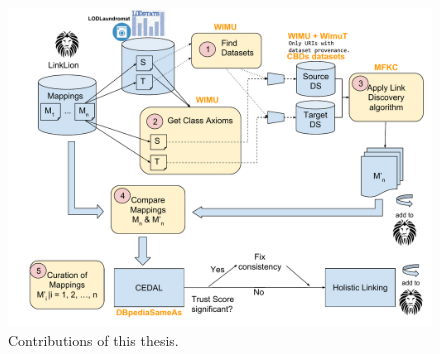 \begin{figure}[htb] 
\centering
\includegraphics[width=1.0\linewidth]{sections/img/LinkLion2.pdf}
\caption{Contributions of this thesis.}
\label{fig:contributions}
\end{figure} 

